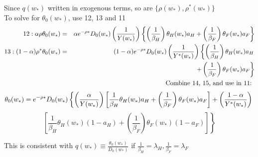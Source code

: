 \documentclass[]{article}
\begin{document}
Since $q(w_*)$ written in exogenous terms, so are $\{\rho (w_*), \rho ^*(w_*)\}$\\

To solve for $\theta _0(w_*)$, use 12, 13 and 11
\begin{eqnarray}
12: \alpha \rho \theta_0(w_*) &=& \alpha e^{-\rho *} D_0(w_*) \left(\frac{1}{Y(w_*)}\right)\left\{\left(\frac{1}{\beta_H}\right)\theta_H(w_*)a_H + \left(\frac{1}{\beta_F}\right)\theta_F(w_*)a_F \right\}\\
13: (1-\alpha) \rho^* \theta_0(w_*) &=& (1-\alpha) e^{-\rho *} D_0(w_*) \left(\frac{1}{Y^*(w_*)}\right)\left\{\left(\frac{1}{\beta_H}\right)\theta_H(w_*)a_H  \right. \notag\\
&&\left.+\left(\frac{1}{\beta_F}\right)\theta_F(w_*)a_F \right\}\\
&&\mbox{Combine 14, 15, and use in 11: }\notag
\end{eqnarray}
\begin{equation*}
\theta_0(w_*) = e^{-\rho *} D_0(w_*)\left\{ \left(\frac{\alpha}{Y(w_*)}\right) \left[\frac{1}{\beta_H} \theta_H(w_*)a_H+\left(\frac{1}{\beta_F}\right)\theta_F(w_*)a_F\right] + \left(\frac{1-\alpha}{Y^*(w_*)}\right)\right.\notag\\
\end{equation*}
\begin{equation*}
\left. \left[\frac{1}{\beta_H} \theta_H(w_*)(1-a_H)+\left(\frac{1}{\beta_F}\right)\theta_F(w_*)(1-a_F)\right] \right\}\tag{15*}
\end{equation*}

This is consistent with $q(w_*) \equiv \frac{\theta_0(w_*)}{D_0(w_*)}$ if $\frac{1}{\beta_H}=\lambda _H, \frac{1}{\beta_F}=\lambda _F$\\
\end{document}
